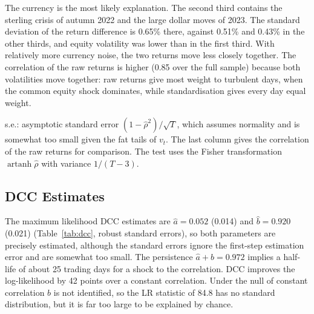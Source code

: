 \documentclass[10pt,a4paper]{article}
\begin{document}
The currency is the most likely explanation. The second third contains the sterling crisis of autumn 2022 and the
large dollar moves of 2023. The standard deviation of the return difference is 0.65\% there, against
0.51\% and 0.43\% in the other thirds, and equity volatility was lower than in the first third. With
relatively more currency noise, the two returns move less closely together. The correlation of the raw
returns is higher (0.85 over the full sample) because both volatilities move together: raw returns give
most weight to turbulent days, when the common equity shock dominates, while standardisation gives every
day equal weight.

\begin{table}[htbp]
\centering
\caption{Standardised residual correlation breakdown}\label{tab:corr_breakdown}
\small

\par\smallskip
\begin{minipage}{0.95\textwidth}\footnotesize
s.e.: asymptotic standard error $(1-\hat\rho^2)/\sqrt{T}$, which assumes normality and is somewhat too
small given the fat tails of $v_t$. The last column gives the correlation of the raw
returns for comparison. The test uses the Fisher transformation $\operatorname{artanh}\hat\rho$ with
variance $1/(T-3)$.
\end{minipage}
\end{table}

\subsection{DCC Estimates}
The maximum likelihood DCC estimates are $\hat a=0.052$ (0.014) and $\hat b=0.920$ (0.021)
(Table~\ref{tab:dcc}, robust standard errors), so both parameters are precisely estimated, although
the standard errors ignore the first-step estimation error and are somewhat too small. The persistence $\hat a+\hat b=0.972$ implies a half-life of about 25 trading days
for a shock to the correlation. DCC improves the log-likelihood by 42 points over a constant correlation.
Under the null of constant correlation $b$ is not identified, so the LR statistic of 84.8 has no standard
distribution, but it is far too large to be explained by chance.

\begin{table}[htbp]
\centering
\caption{DCC(1,1) estimates for the standardised GJR(1,1,1) residuals}\label{tab:dcc}
\small

\end{table}
\end{document}
